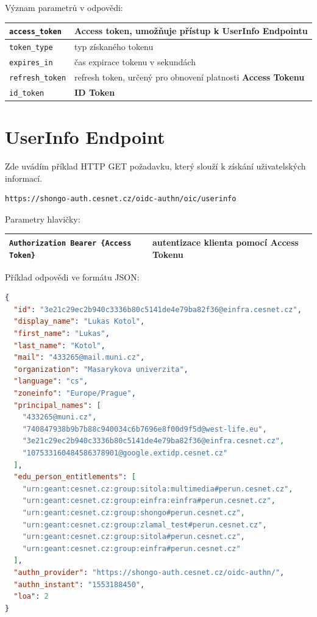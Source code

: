 \documentclass[
  printed, %
  twoside, %
  table,   %
  nolof,     %
  nolot,     %
]{fithesis3}
\begin{document}
\noindent
Význam parametrů v odpovědi:
\label{table:autentizace}
\begin{table}[H]
\begin{tabular}{|l|l|}
\hline
\texttt{access\_token}   & \parbox[t]{9cm}{\textbf{Access token}, umožňuje přístup k UserInfo Endpointu}  \\ \hline
\texttt{token\_type}  & \parbox[t]{9cm}{typ získaného tokenu}  \\ \hline
\texttt{expires\_in}  & \parbox[t]{9cm}{čas expirace tokenu v sekundách}  \\ \hline
\texttt{refresh\_token}  & \parbox[t]{9cm}{refresh token, určený pro obnovení platnosti \textbf{Access Tokenu}}  \\ \hline
\texttt{id\_token}  & \parbox[t]{9cm}{\textbf{ID Token}}  \\ \hline

\end{tabular}
\end{table}


\section{UserInfo Endpoint}
Zde uvádím příklad HTTP GET požadavku, který slouží k získání uživatelských informací. 

\begin{lstlisting}
https://shongo-auth.cesnet.cz/oidc-authn/oic/userinfo
\end{lstlisting}

\noindent
Parametry hlavičky: 

\label{token:}
\begin{table}[H]
\begin{tabular}{|l|l|}
\hline
\parbox[t]{7cm}{\texttt{Authorization Bearer \{Access Token\}}} & \parbox[t]{4.8cm}{autentizace klienta pomocí \textbf{Access Tokenu}}  \\ \hline
\end{tabular}
\end{table}


\clearpage
\noindent
Příklad odpovědi ve formátu JSON:
\begin{lstlisting}[language=json,firstnumber=1]
{
  "id": "3e21c29ec2b940c3336b80c5141de4e79ba82f36@einfra.cesnet.cz",
  "display_name": "Lukas Kotol",
  "first_name": "Lukas",
  "last_name": "Kotol",
  "mail": "433265@mail.muni.cz",
  "organization": "Masarykova univerzita",
  "language": "cs",
  "zoneinfo": "Europe/Prague",
  "principal_names": [
    "433265@muni.cz",
    "740847938b9b7b88c940034c6b7696e8f00d9f5d@west-life.eu",
    "3e21c29ec2b940c3336b80c5141de4e79ba82f36@einfra.cesnet.cz",
    "107533160484586378901@google.extidp.cesnet.cz"
  ],
  "edu_person_entitlements": [
    "urn:geant:cesnet.cz:group:sitola:multimedia#perun.cesnet.cz",
    "urn:geant:cesnet.cz:group:einfra:einfra#perun.cesnet.cz",
    "urn:geant:cesnet.cz:group:shongo#perun.cesnet.cz",
    "urn:geant:cesnet.cz:group:zlamal_test#perun.cesnet.cz",
    "urn:geant:cesnet.cz:group:sitola#perun.cesnet.cz",
    "urn:geant:cesnet.cz:group:einfra#perun.cesnet.cz"
  ],
  "authn_provider": "https://shongo-auth.cesnet.cz/oidc-authn/",
  "authn_instant": "1553188450",
  "loa": 2
}
\end{lstlisting}
\end{document}
